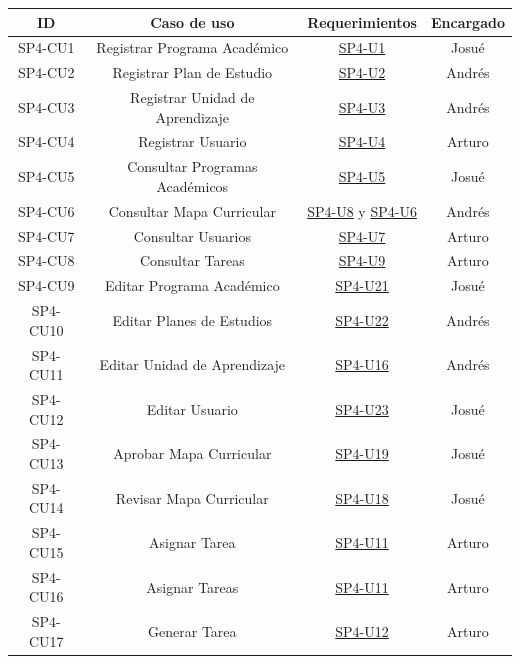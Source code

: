 \begin{center}
	\begin{tabular}{|c|c|c|c|}
		\hline
		ID        & Caso de uso                        & Requerimientos                                           & Encargado \\ \hline
        SP4-CU1   & Registrar Programa Académico       & \hyperref[SP4-U1]{SP4-U1}                                & Josué \\ \hline
        SP4-CU2   & Registrar Plan de Estudio          & \hyperref[SP4-U2]{SP4-U2}                                & Andrés \\ \hline
        SP4-CU3   & Registrar Unidad de Aprendizaje    & \hyperref[SP4-U3]{SP4-U3}                                & Andrés \\ \hline
        SP4-CU4   & Registrar Usuario                  & \hyperref[SP4-U4]{SP4-U4}                                & Arturo \\ \hline
        SP4-CU5   & Consultar Programas Académicos     & \hyperref[SP4-U5]{SP4-U5}                                & Josué \\ \hline
        SP4-CU6   & Consultar Mapa Curricular          & \hyperref[SP4-U8]{SP4-U8} y \hyperref[SP4-U6]{SP4-U6}    & Andrés \\ \hline
        SP4-CU7   & Consultar Usuarios                 & \hyperref[SP4-U7]{SP4-U7}                                & Arturo \\ \hline
        SP4-CU8   & Consultar Tareas                   & \hyperref[SP4-U9]{SP4-U9}                                & Arturo \\ \hline
        SP4-CU9   & Editar Programa Académico          & \hyperref[SP4-U21]{SP4-U21}                              & Josué \\ \hline
        SP4-CU10  & Editar Planes de Estudios          & \hyperref[SP4-U22]{SP4-U22}                              & Andrés \\ \hline
        SP4-CU11  & Editar Unidad de Aprendizaje       & \hyperref[SP4-U16]{SP4-U16}                              & Andrés \\ \hline
        SP4-CU12  & Editar Usuario                     & \hyperref[SP4-U23]{SP4-U23}                              & Josué \\ \hline
        SP4-CU13  & Aprobar Mapa Curricular            & \hyperref[SP4-U19]{SP4-U19}                              & Josué \\ \hline
        SP4-CU14  & Revisar Mapa Curricular            & \hyperref[SP4-U18]{SP4-U18}                              & Josué \\ \hline
        SP4-CU15  & Asignar Tarea                      & \hyperref[SP4-U11]{SP4-U11}                              & Arturo \\ \hline
        SP4-CU16  & Asignar Tareas                     & \hyperref[SP4-U11]{SP4-U11}                              & Arturo \\ \hline
        SP4-CU17  & Generar Tarea                      & \hyperref[SP4-U12]{SP4-U12}                              & Arturo \\ \hline
    \end{tabular}
\end{center}
